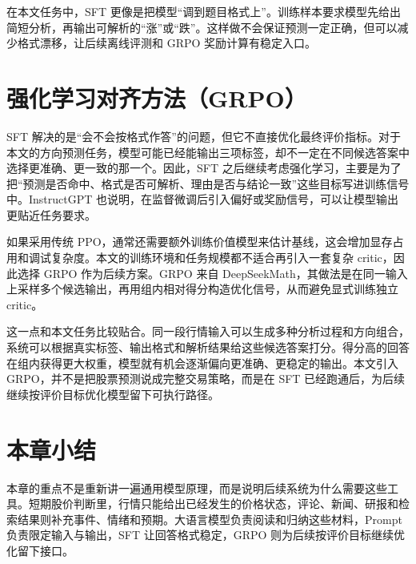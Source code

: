 在本文任务中，SFT 更像是把模型“调到题目格式上”。训练样本要求模型先给出简短分析，再输出可解析的“涨”或“跌”。这样做不会保证预测一定正确，但可以减少格式漂移，让后续离线评测和 GRPO 奖励计算有稳定入口。

\section{强化学习对齐方法（GRPO）}

SFT 解决的是“会不会按格式作答”的问题，但它不直接优化最终评价指标。对于本文的方向预测任务，模型可能已经能输出三项标签，却不一定在不同候选答案中选择更准确、更一致的那一个。因此，SFT 之后继续考虑强化学习，主要是为了把“预测是否命中、格式是否可解析、理由是否与结论一致”这些目标写进训练信号中。InstructGPT 也说明，在监督微调后引入偏好或奖励信号，可以让模型输出更贴近任务要求\cite{ouyang2022instructgpt}。

如果采用传统 PPO，通常还需要额外训练价值模型来估计基线，这会增加显存占用和调试复杂度\cite{schulman2017ppo}。本文的训练环境和任务规模都不适合再引入一套复杂 critic，因此选择 GRPO 作为后续方案。GRPO 来自 DeepSeekMath，其做法是在同一输入上采样多个候选输出，再用组内相对得分构造优化信号，从而避免显式训练独立 critic\cite{shao2024deepseekmath}。

这一点和本文任务比较贴合。同一段行情输入可以生成多种分析过程和方向组合，系统可以根据真实标签、输出格式和解析结果给这些候选答案打分。得分高的回答在组内获得更大权重，模型就有机会逐渐偏向更准确、更稳定的输出。本文引入 GRPO，并不是把股票预测说成完整交易策略，而是在 SFT 已经跑通后，为后续继续按评价目标优化模型留下可执行路径。

\section{本章小结}

本章的重点不是重新讲一遍通用模型原理，而是说明后续系统为什么需要这些工具。短期股价判断里，行情只能给出已经发生的价格状态，评论、新闻、研报和检索结果则补充事件、情绪和预期。大语言模型负责阅读和归纳这些材料，Prompt 负责限定输入与输出，SFT 让回答格式稳定，GRPO 则为后续按评价目标继续优化留下接口。
